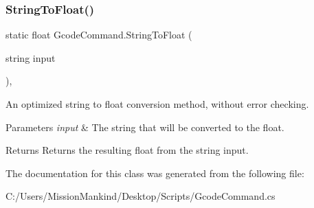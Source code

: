 \subsubsection{\texorpdfstring{String\+To\+Float()}{StringToFloat()}}
{\footnotesize\ttfamily static float Gcode\+Command.\+String\+To\+Float (\begin{DoxyParamCaption}\item[{string}]{input }\end{DoxyParamCaption})\hspace{0.3cm}{\ttfamily [static]}, {\ttfamily [private]}}



An optimized string to float conversion method, without error checking. 


\begin{DoxyParams}{Parameters}
{\em input} & The string that will be converted to the float.\\
\hline
\end{DoxyParams}
\begin{DoxyReturn}{Returns}
Returns the resulting float from the string input.
\end{DoxyReturn}


The documentation for this class was generated from the following file\+:\begin{DoxyCompactItemize}
\item 
C\+:/\+Users/\+Mission\+Mankind/\+Desktop/\+Scripts/Gcode\+Command.\+cs\end{DoxyCompactItemize}
